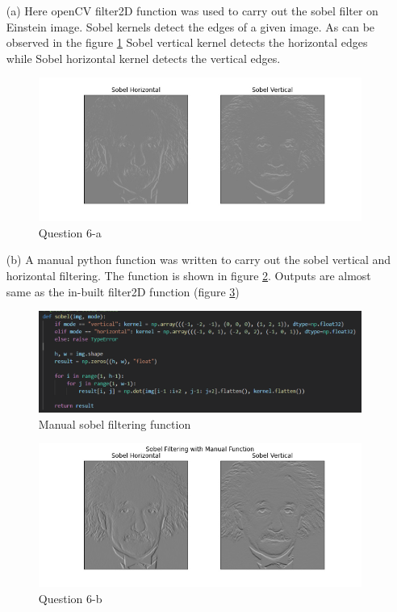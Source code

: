 \documentclass[11pt]{article}
\begin{document}
\begin{itemize}
    \item[(a)] Here openCV filter2D function was used to carry out the sobel filter on Einstein image. Sobel kernels detect the
            edges of a given image. As can be observed in the figure \ref{51} Sobel vertical kernel detects the horizontal edges while 
            Sobel horizontal kernel detects the vertical edges. 
    
    \begin{figure}[!h]
        \centering
        \includegraphics[width=\textwidth]{Images/51.jpg}
        \caption{Question 6-a}
        \label{51}
    \end{figure}

    \item[(b)] A manual python function was written to carry out the sobel vertical and horizontal filtering. The function is shown in figure 
        \ref{6code}. Outputs are almost same as the in-built filter2D function (figure \ref{52})
    
    \begin{figure}[!h]
        \centering
        \includegraphics[width=\textwidth]{Images/6code.PNG}
        \caption{Manual sobel filtering function}
        \label{6code}
    \end{figure}

    \begin{figure}[!h]
        \centering
        \includegraphics[width=\textwidth]{Images/52.jpg}
        \caption{Question 6-b}
        \label{52}
    \end{figure}


\end{itemize}
\end{document}
